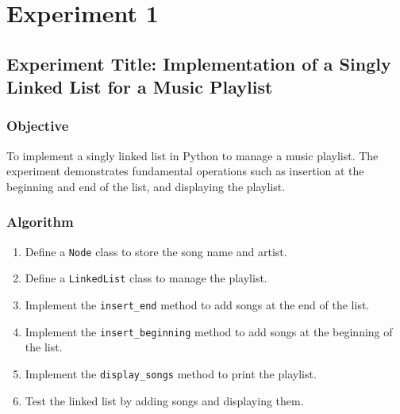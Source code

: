 \documentclass[a4paper,12pt]{article}
\begin{document}
\section*{ Experiment 1}
\label{sec:exp1}
\subsection*{Experiment Title: Implementation of a Singly Linked List for a Music Playlist}

\subsubsection*{Objective}
To implement a singly linked list in Python to manage a music playlist. The experiment demonstrates fundamental operations such as insertion at the beginning and end of the list, and displaying the playlist.

\subsubsection*{Algorithm}
\begin{enumerate}
    \item Define a \texttt{Node} class to store the song name and artist.
    \item Define a \texttt{LinkedList} class to manage the playlist.
    \item Implement the \texttt{insert\_end} method to add songs at the end of the list.
    \item Implement the \texttt{insert\_beginning} method to add songs at the beginning of the list.
    \item Implement the \texttt{display\_songs} method to print the playlist.
    \item Test the linked list by adding songs and displaying them.
\end{enumerate}
\end{document}
